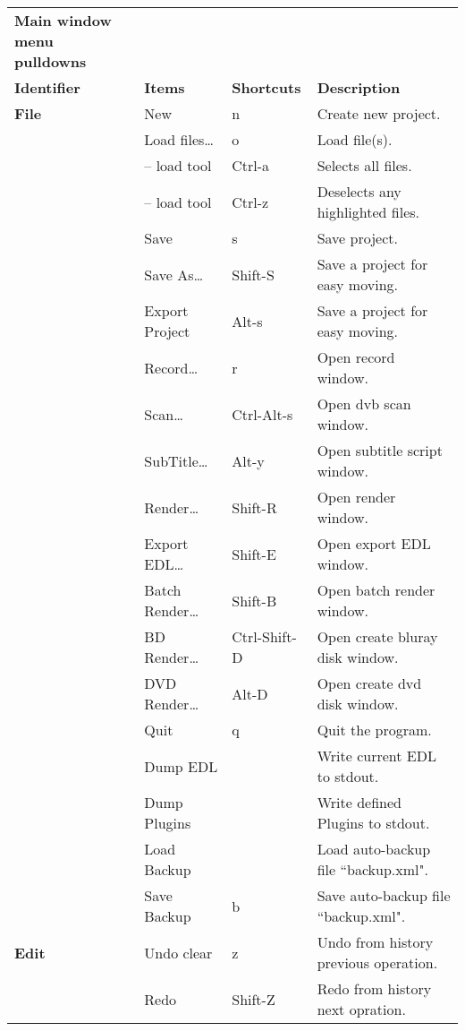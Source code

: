 \begin{longtable}[h]{>{\bfseries}p{}p{}p{}p{}}
  \toprule
  \multicolumn{4}{c}%
  {\textcolor{CinRed}{\textbf{Main window menu pulldowns}}} \\
  Identifier & \textbf{Items} & \textbf{Shortcuts} & \textbf{Description}\\
  \midrule
  \endhead
  \textcolor{CinBlueText}{File} & New & n & Create new project. \\
  & Load files\dots & o & Load file(s). \\
  & -- load tool & Ctrl-a & Selects all files. \\
  & -- load tool & Ctrl-z & Deselects any highlighted files. \\
  & Save & s & Save project. \\
  & Save As\dots & Shift-S & Save a project for easy moving. \\
  & Export Project & Alt-s & Save a project for easy moving. \\
  & Record\dots & r & Open record window. \\
  & Scan\dots & Ctrl-Alt-s & Open dvb scan window. \\
  & SubTitle\dots & Alt-y & Open subtitle script window. \\
  & Render\dots & Shift-R & Open render window. \\
  & Export EDL\dots & Shift-E & Open export EDL window. \\
  & Batch Render\dots & Shift-B & Open batch render window. \\
  & BD Render\dots & Ctrl-Shift-D & Open create bluray disk window. \\
  & DVD Render\dots & Alt-D & Open create dvd disk window. \\
  & Quit & q & Quit the program. \\
  & Dump EDL &  & Write current EDL to stdout. \\
  & Dump Plugins &  & Write defined Plugins to stdout. \\
  & Load Backup &  & Load auto-backup file “backup.xml". \\
  & Save Backup & b & Save auto-backup file “backup.xml". \\
  \midrule
  \textcolor{CinBlueText}{Edit} & Undo clear & z & Undo from history previous operation. \\
  & Redo & Shift-Z & Redo from history next opration. \\

\end{longtable}
